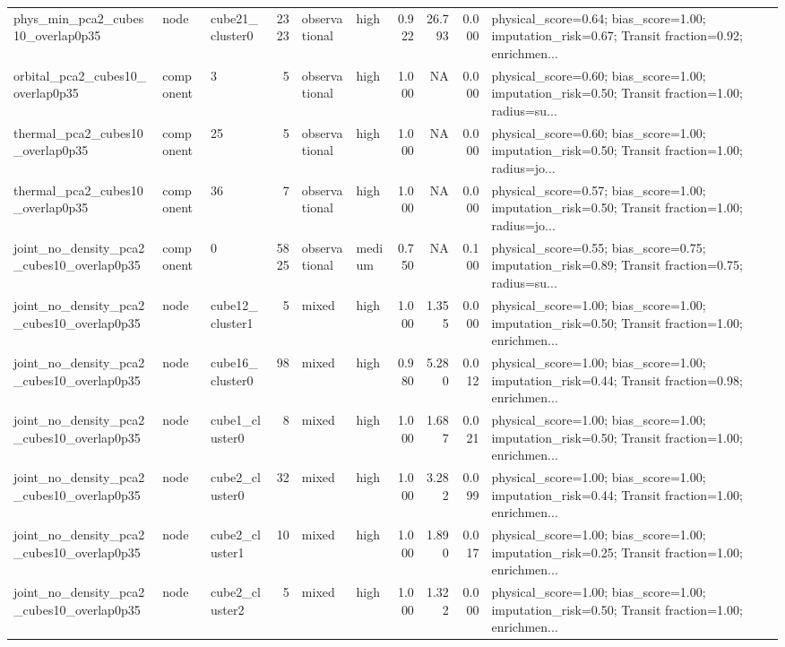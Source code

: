 \begin{table}[H]
\begin{adjustbox}{max width=\linewidth}
\begin{tabular}{lllrllrrrl}
phys\_min\_pca2\_cubes10\_overlap0p35 & node & cube21\_cluster0 & 2323 & observational & high & 0.922 & 26.793 & 0.000 & physical\_score=0.64; bias\_score=1.00; imputation\_risk=0.67; Transit fraction=0.92; enrichmen... \\
orbital\_pca2\_cubes10\_overlap0p35 & component & 3 & 5 & observational & high & 1.000 & NA & 0.000 & physical\_score=0.60; bias\_score=1.00; imputation\_risk=0.50; Transit fraction=1.00; radius=su... \\
thermal\_pca2\_cubes10\_overlap0p35 & component & 25 & 5 & observational & high & 1.000 & NA & 0.000 & physical\_score=0.60; bias\_score=1.00; imputation\_risk=0.50; Transit fraction=1.00; radius=jo... \\
thermal\_pca2\_cubes10\_overlap0p35 & component & 36 & 7 & observational & high & 1.000 & NA & 0.000 & physical\_score=0.57; bias\_score=1.00; imputation\_risk=0.50; Transit fraction=1.00; radius=jo... \\
joint\_no\_density\_pca2\_cubes10\_overlap0p35 & component & 0 & 5825 & observational & medium & 0.750 & NA & 0.100 & physical\_score=0.55; bias\_score=0.75; imputation\_risk=0.89; Transit fraction=0.75; radius=su... \\
joint\_no\_density\_pca2\_cubes10\_overlap0p35 & node & cube12\_cluster1 & 5 & mixed & high & 1.000 & 1.355 & 0.000 & physical\_score=1.00; bias\_score=1.00; imputation\_risk=0.50; Transit fraction=1.00; enrichmen... \\
joint\_no\_density\_pca2\_cubes10\_overlap0p35 & node & cube16\_cluster0 & 98 & mixed & high & 0.980 & 5.280 & 0.012 & physical\_score=1.00; bias\_score=1.00; imputation\_risk=0.44; Transit fraction=0.98; enrichmen... \\
joint\_no\_density\_pca2\_cubes10\_overlap0p35 & node & cube1\_cluster0 & 8 & mixed & high & 1.000 & 1.687 & 0.021 & physical\_score=1.00; bias\_score=1.00; imputation\_risk=0.50; Transit fraction=1.00; enrichmen... \\
joint\_no\_density\_pca2\_cubes10\_overlap0p35 & node & cube2\_cluster0 & 32 & mixed & high & 1.000 & 3.282 & 0.099 & physical\_score=1.00; bias\_score=1.00; imputation\_risk=0.44; Transit fraction=1.00; enrichmen... \\
joint\_no\_density\_pca2\_cubes10\_overlap0p35 & node & cube2\_cluster1 & 10 & mixed & high & 1.000 & 1.890 & 0.017 & physical\_score=1.00; bias\_score=1.00; imputation\_risk=0.25; Transit fraction=1.00; enrichmen... \\
joint\_no\_density\_pca2\_cubes10\_overlap0p35 & node & cube2\_cluster2 & 5 & mixed & high & 1.000 & 1.322 & 0.000 & physical\_score=1.00; bias\_score=1.00; imputation\_risk=0.50; Transit fraction=1.00; enrichmen... \\

\end{tabular}
\end{adjustbox}
\end{table}
